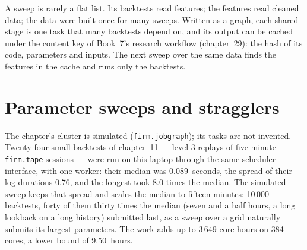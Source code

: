A sweep is rarely a flat list. Its backtests read features; the features read cleaned data; the data were built once for many sweeps.
Written as a graph, each shared stage is one task that many backtests depend on, and its output can be cached under the content key of
Book~7's research workflow (chapter~29): the hash of its code, parameters and inputs. The next sweep over the same data finds the features
in the cache and runs only the backtests.

\section{Parameter sweeps and stragglers}

\begin{omfigure}

\label{fig:pl:distributed-compute-and-schedulers:graph}
\end{omfigure}

The chapter's cluster is simulated (\texttt{firm.jobgraph}); its tasks are not invented. Twenty-four small backtests of chapter~11 ---
level-3 replays of five-minute \texttt{firm.tape} sessions --- were run on this laptop through the same scheduler interface, with one
worker: their median was 0.089~seconds, the spread of their log durations 0.76, and the longest took 8.0 times the median. The simulated
sweep keeps that spread and scales the median to fifteen minutes: 10\,000 backtests, forty of them thirty times the median (seven and a
half hours, a long lookback on a long history) submitted last, as a sweep over a grid naturally submits its largest parameters. The work
adds up to 3\,649 core-hours on 384 cores, a lower bound of 9.50~hours.

